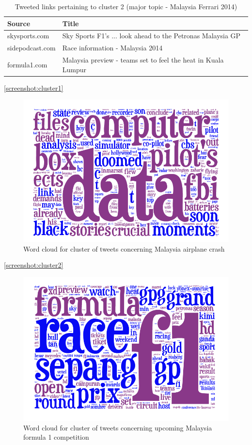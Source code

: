 \documentclass{acm_proc_10ptArticle-sp}
\begin{document}
\begin{table}[!ht]
  \centering
  \caption{Tweeted links pertaining to cluster 2 (major topic - Malaysia Ferrari 2014)}
    \label{table:linkscluster}
    \begin{tabular}{| l | l |}
	Source & Title \\ \hline
skysports.com & Sky Sports F1's ... look ahead to the Petronas Malaysia GP \\
sidepodcast.com & Race information - Malaysia 2014\\
formula1.com & Malaysia preview - teams set to feel the heat in Kuala Lumpur\\
  \end{tabular}
\end{table}

\ref{screenshot:cluster1}
\begin{figure}[H]
  \centering
  \includegraphics[width=0.9\linewidth]{img/cluster1.png}
  \caption{Word cloud for cluster of tweets concerning Malaysia airplane crash}
  \label{screenshot:limitation}
\end{figure}

\ref{screenshot:cluster2}
\begin{figure}[H]
  \centering
  \includegraphics[width=0.9\linewidth]{img/cluster2.png}
  \caption{Word cloud for cluster of tweets concerning upcoming Malaysia formula 1 competition}
  \label{screenshot:limitation}
\end{figure}
\end{document}
